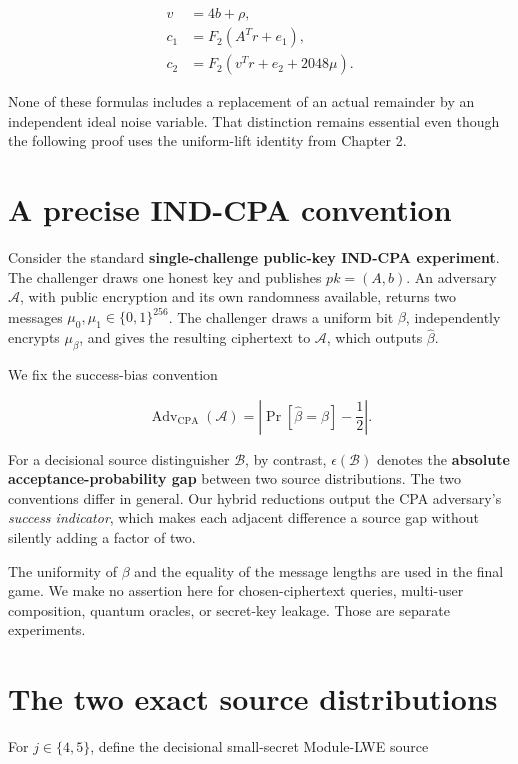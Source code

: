 \documentclass[
  11pt,
  a4paper,
  oneside]{report}
\begin{document}
\[
\begin{aligned}
v&=4b+\rho,\\
c_1&=F_2(A^Tr+e_1),\\
c_2&=F_2(v^Tr+e_2+2048\mu).
\end{aligned}
\]

None of these formulas includes a replacement of an actual remainder by
an independent ideal noise variable. That distinction remains essential
even though the following proof uses the uniform-lift identity from
Chapter 2.

\section{A precise IND-CPA
convention}\label{a-precise-ind-cpa-convention}

Consider the standard \textbf{single-challenge public-key IND-CPA
experiment}. The challenger draws one honest key and publishes
\(pk=(A,b)\). An adversary \(\mathcal A\), with public encryption and
its own randomness available, returns two messages
\(\mu_0,\mu_1\in\{0,1\}^{256}\). The challenger draws a uniform bit
\(\beta\), independently encrypts \(\mu_\beta\), and gives the resulting
ciphertext to \(\mathcal A\), which outputs \(\widehat\beta\).

We fix the success-bias convention

\[
\operatorname{Adv}_{\mathrm{CPA}}(\mathcal A)
=\left|\Pr[\widehat\beta=\beta]-\frac12\right|.
\]

For a decisional source distinguisher \(\mathcal B\), by contrast,
\(\epsilon(\mathcal B)\) denotes the \textbf{absolute
acceptance-probability gap} between two source distributions. The two
conventions differ in general. Our hybrid reductions output the CPA
adversary's \emph{success indicator}, which makes each adjacent
difference a source gap without silently adding a factor of two.

The uniformity of \(\beta\) and the equality of the message lengths are
used in the final game. We make no assertion here for chosen-ciphertext
queries, multi-user composition, quantum oracles, or secret-key leakage.
Those are separate experiments.

\section{The two exact source
distributions}\label{the-two-exact-source-distributions}

For \(j\in\{4,5\}\), define the decisional small-secret Module-LWE
source
\end{document}
